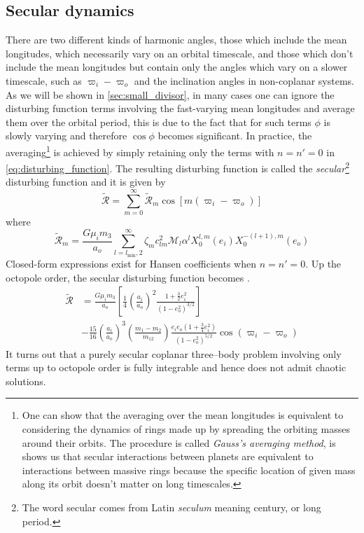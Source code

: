 \documentclass[twoside,openright,titlepage,numbers=noenddot,headinclude,%
                footinclude=true,cleardoublepage=empty,abstractoff, 
                BCOR=5mm,paper=a4,fontsize=11pt,%
                american,%
                ]{scrreprt}%
\begin{document}
\subsection{Secular dynamics}
\label{sub:secular_dynamics}
There are two different kinds of harmonic angles, those which 
include the mean longitudes, which necessarily vary on an orbital
timescale, and those which don't include the mean longitudes but
contain only the angles which vary on a slower timescale, such 
as $\varpi_i-\varpi_o$ and the inclination angles in non-coplanar
systems. As we will be shown in \cref{sec:small_divisor}, in many
cases one can ignore the disturbing function terms involving the 
fast-varying mean longitudes and average them over the orbital
period, this is due to the fact that for such terms $\phi$ is 
slowly varying and therefore $\cos{\phi}$ becomes significant.
 In practice, the averaging\footnote{One can show \citep{murray}
that the averaging over the mean longitudes is equivalent to 
considering the dynamics of rings made up by spreading the 
orbiting masses
around their orbits. The procedure is called \emph{Gauss's 
averaging method}, is shows us that secular interactions
between planets are equivalent to interactions between massive
rings because the specific location of given mass along its orbit
doesn't matter on long timescales.} 
is achieved by simply retaining only
the terms with $n=n'=0$ in \cref{eq:disturbing_function}. The 
resulting disturbing function is called the 
\emph{secular}\footnote{The word secular comes from Latin 
\emph{seculum} meaning
century, or long period.} disturbing function and it is given by
\begin{equation}
    \tilde{\mathcal{R}}=\sum^\infty_{m=0}\tilde{\mathcal{R}}_m
    \cos[m(\varpi_i-\varpi_o)]
    \label{eq:secular_dist}
\end{equation}
where
\begin{equation}
    \tilde{\mathcal{R}}_m= \frac{G\mu_im_3}{a_o}
    \sum^\infty_{l=l_\text{min},2}\zeta_mc_{lm}^2\mathcal{M}_l
    \alpha^l X_0^{l,m}(e_i)X_0^{-(l+1),m}(e_o)
\end{equation}
Closed-form expressions exist for Hansen coefficients when $n=n'=0$.
Up the octopole order, the secular disturbing function becomes
\citep{Mardling2013}.
\begin{equation}
\begin{aligned}
    \tilde{\mathcal{R}}&= \frac{G\mu_im_3}{a_o}\left[ \frac{1}{4} 
    \left( \frac{a_i}{a_o} \right)^2 
    \frac{1+ \frac{3}{2} e_i^2}{(1-e_o^2)^{3/2}}\right]\\  
    &-\frac{15}{16}
    \left( \frac{a_i}{a_o} \right)^3\left( \frac{m_1-m_2}{m_{12}}
    \right) \frac{e_ie_o(1+ \frac{3}{4} e_i^2)}{(1-e_o^2)^{5/2}} 
    \cos(\varpi_i-\varpi_o)
\end{aligned}
    \label{eq:dist_sec_octopole}
\end{equation}
It turns out that a purely secular coplanar three--body problem 
involving only terms
up to octopole order is fully integrable \citep[ex.][]{murray}
and hence does not admit chaotic solutions. 
\end{document}
